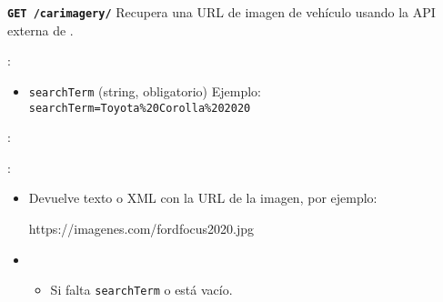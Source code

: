 \documentclass[a4paper,11pt,spanish]{sphinxmanual}
\newcommand{\robotoMonoBold}{\fontseries{b}\selectfont\ttfamily}
\renewcommand{\sphinxcode}[1]{\textcolor{sphinxorangeCode}{{\robotoMonoBold #1}}}
\renewcommand{\sphinxbfcode}[1]{\textbf{\sphinxcode{#1}}}
\renewcommand{\sphinxupquote}[1]{\texttt{#1}}
\begin{document}
\begin{fulllineitems}
\label{\detokenize{endpoints:get--car-imagery-}}
\pysigstartsignatures
\pysigline
{\sphinxbfcode{\sphinxupquote{GET~}}\sphinxbfcode{\sphinxupquote{/car\sphinxhyphen{}imagery/}}}
\pysigstopsignatures
\sphinxAtStartPar
Recupera una URL de imagen de vehículo usando la API externa de .

\sphinxAtStartPar
{}:
\begin{itemize}
\item {} 
\sphinxAtStartPar
\sphinxcode{\sphinxupquote{searchTerm}} (string, obligatorio)
Ejemplo: \sphinxcode{\sphinxupquote{searchTerm=Toyota\%20Corolla\%202020}}

\end{itemize}

\sphinxAtStartPar
{}:

\begin{sphinxVerbatim}[commandchars=\\\{\}]
  
 
\end{sphinxVerbatim}

\sphinxAtStartPar
{}:
\begin{itemize}
\item {} 
\sphinxAtStartPar
{}

\sphinxAtStartPar
Devuelve texto o XML con la URL de la imagen, por ejemplo:

\begin{sphinxVerbatim}[commandchars=\\\{\}]
https://imagenes.com/ford\PYGZus{}focus\PYGZus{}2020.jpg
\end{sphinxVerbatim}

\item {} 
\sphinxAtStartPar
{}
\begin{itemize}
\item {} 
\sphinxAtStartPar
Si falta \sphinxcode{\sphinxupquote{searchTerm}} o está vacío.

\end{itemize}


\end{itemize}
\end{fulllineitems}
\end{document}

